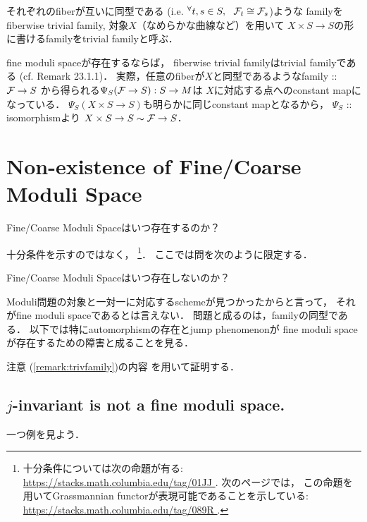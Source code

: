 \documentclass[a4paper]{jsarticle}
\begin{document}
    \begin{Remark}\label{remark:trivfamily}
        それぞれのfiberが互いに同型である
        (i.e. ${}^{\forall} t,s \in S,~~ \mathcal{F}_t \cong \mathcal{F}_s$)ような
        familyをfiberwise trivial family, 
        対象$X$（なめらかな曲線など）を用いて
        $X \times S \to S$の形に書けるfamilyをtrivial familyと呼ぶ．

        fine moduli spaceが存在するならば，
        fiberwise trivial familyはtrivial familyである
        (cf. \cite{HarDef} Remark 23.1.1)．
        実際，任意のfiberが$X$と同型であるようなfamily :: $\mathcal{F} \to S$
        から得られる$\Psi_S(\mathcal{F} \to S): S \to M$は
        $X$に対応する点へのconstant mapになっている．
        $\Psi_S(X \times S \to S)$も明らかに同じconstant mapとなるから，
        $\Psi_S$ :: isomorphismより
        $X \times S \to S \sim \mathcal{F} \to S$．
    \end{Remark}

\section{Non-existence of Fine/Coarse Moduli Space}
    \begin{question}
        Fine/Coarse Moduli Spaceはいつ存在するのか？
    \end{question}
    十分条件を示すのではなく，
    \footnote
    {
        十分条件については次の命題が有る:
        \url{ https://stacks.math.columbia.edu/tag/01JJ }.
        次のページでは，
        この命題を用いてGrassmannian functorが表現可能であることを示している:
        \url{ https://stacks.math.columbia.edu/tag/089R }.
    }．
    ここでは問を次のように限定する．
    \begin{question}
        Fine/Coarse Moduli Spaceはいつ存在しないのか？
    \end{question}

    Moduli問題の対象と一対一に対応するschemeが見つかったからと言って，
    それがfine moduli spaceであるとは言えない．
    問題と成るのは，familyの同型である．
    以下では特にautomorphismの存在とjump phenomenonが
    fine moduli spaceが存在するための障害と成ることを見る．

    注意 (\ref{remark:trivfamily})の内容
    を用いて証明する．

    \subsection{\texorpdfstring{$j$}{j}-invariant is not a fine moduli space.}
    一つ例を見よう．
\end{document}
